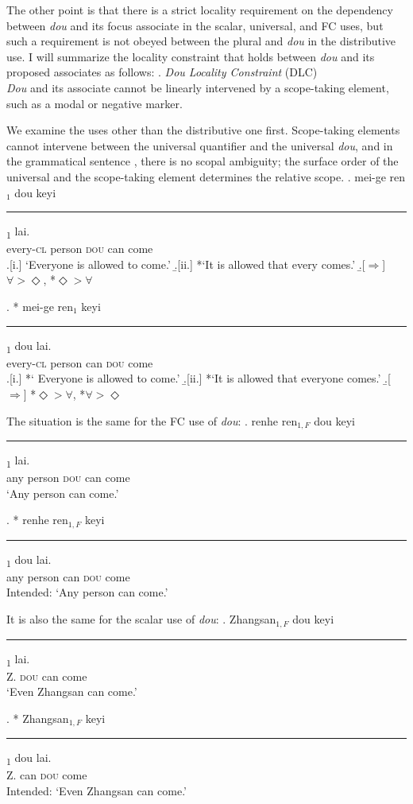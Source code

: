 \documentclass[12pt]{article}
\let\latextextsubscript\textsubscript
\let\textsubscript\latextextsubscript
\newcommand{\gap}[1]{\rule{1em}{0.4pt}\textsubscript{#1}}
\begin{document}
The other point is that there is a strict locality requirement on the dependency between \emph{dou} and its focus associate in the scalar, universal, and FC uses, but such a requirement is not obeyed between the plural and \emph{dou} in the distributive use.
I will summarize the locality constraint that holds between \emph{dou} and its proposed associates as follows:
\ex. \emph{\emph{Dou} Locality Constraint} (DLC)\\
\emph{Dou} and its associate cannot be linearly intervened by a scope-taking element, such as a modal or negative marker. \label{itm:dlc}

We examine the uses other than the distributive one first.
Scope-taking elements cannot intervene between the universal quantifier and the universal \emph{dou}, and in the grammatical sentence \Last, there is no scopal ambiguity; the surface order of the universal and the scope-taking element determines the relative scope. 
\ex. \gll
mei-ge ren\(_1\) dou  keyi  \gap{1}  lai. \\
every-\textsc{cl} person \textsc{dou} can {} come \\
\a.[i.] `Everyone is allowed to come.'
\b.[ii.] *`It is allowed that every comes.'
\b.[\(\Rightarrow\)] \(\forall > \Diamond\), *\(\Diamond > \forall\)

\ex. *\gll
mei-ge ren\(_1\)  keyi  \gap{1} dou  lai. \\
every-\textsc{cl} person can {} \textsc{dou} come \\
\a.[i.] *` Everyone is allowed to come.'
\b.[ii.] *`It is allowed that everyone comes.'
\b.[\(\Rightarrow\)] {}*\(\Diamond > \forall\), *\(\forall > \Diamond\)

The situation is the same for the FC use of \emph{dou}:
\ex. \gll
renhe ren\(_{1, F}\) dou keyi  \gap{1} lai. \\
any person \textsc{dou} can {} come \\
\glt `Any person can come.'

\ex. * \gll
renhe ren\(_{1, F}\) keyi  \gap{1} dou lai. \\
any person can {} \textsc{dou} come \\
\glt Intended: `Any person can come.'

It is also the same for the scalar use of \emph{dou}:
\ex. \gll
Zhangsan\(_{1, F}\) dou keyi  \gap{1} lai. \\
Z. \textsc{dou} can {} {}  come \\
\glt `Even Zhangsan can come.'

\ex. * \gll
Zhangsan\(_{1, F}\) keyi  \gap{1} dou lai. \\
Z. can {} {} \textsc{dou} come \\
\glt Intended: `Even Zhangsan can come.'
\end{document}

